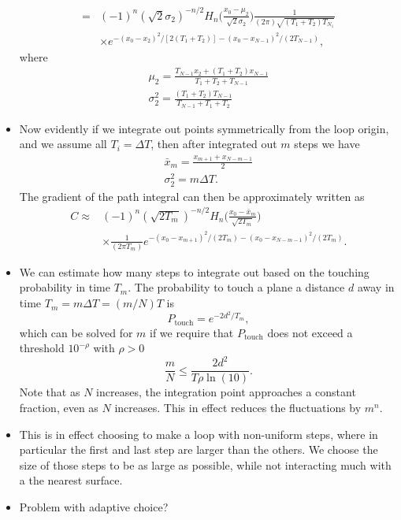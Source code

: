 \begin{itemize}
\begin{align}
      =&(-1)^n(\sqrt{2}\sigma_2)^{-n/2}H_n\bigg(\frac{x_0-\mu_2}{\sqrt{2}\sigma_2}\bigg)
      \frac{1}{(2\pi)\sqrt{(T_1+T_2)T_{N_1}}}\nonumber\\
      &\times e^{-(x_0-x_2)^2/[2(T_1+T_2)]-(x_0-x_{N-1})^2/(2T_{N-1})},
    \end{align}
    where 
    \begin{gather}
      \mu_2 = \frac{T_{N-1}x_2+ (T_1+T_2)x_{N-1}}{T_1+T_2+T_{N-1}}\\
      \sigma_2^2 = \frac{(T_1+T_2)T_{N-1}}{T_{N-1}+T_1+T_2}
    \end{gather}
  \item Now evidently if we integrate out points symmetrically from the loop origin, and we 
    assume all $T_i=\Delta T$, then after integrated out $m$ steps we have 
    \begin{gather}
      \bar{x}_m = \frac{x_{m+1}+ x_{N-m-1}}{2}\\
      \sigma_2^2 = m\Delta T.
    \end{gather}
    The gradient of the path integral can then be approximately written as 
    \begin{align}
      C\approx
      &(-1)^n(\sqrt{2 T_m})^{-n/2}H_n\bigg(\frac{x_0-\bar{x}_m}{\sqrt{2 T_m}}\bigg)\nonumber\\
      &\times \frac{1}{(2\pi T_m)}e^{-(x_0-x_{m+1})^2/(2T_m)-(x_0-x_{N-m-1})^2/(2T_m)}.
    \end{align}
  \item We can estimate how many steps to integrate out based on the touching probability in time $T_m$.  
    The probability to touch a plane a distance $d$ away in time $T_m=m\Delta T = (m/N)T$ is 
    \begin{equation}
      P_{\text{touch}} = e^{-2d^2/T_m},
    \end{equation}
    which can be solved for $m$ if we require that $P_{\mathrm{touch}}$ does not exceed a threshold
    $10^{-\rho}$ with $\rho>0$  
    \begin{equation}
      \frac{m}{N} \le \frac{2d^2}{T\rho\ln(10)}.
    \end{equation}
    Note that as $N$ increases, the integration point approaches a constant fraction, even as $N$ increases.  
    This in effect reduces the fluctuations by $m^n$.  
    \item This is in effect choosing to make a loop with non-uniform steps, where in particular the first
    and last step are larger than the others.  We choose the size of those steps to be as 
    large as possible, while not interacting much with a the nearest surface.  

    \item Problem with adaptive choice?
\end{itemize}


